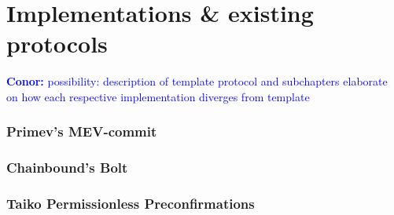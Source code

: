 \documentclass[a4paper]{article}
\theoremstyle{boldstyle}
\newcommand{\cm}[1]{\textcolor{blue}{\textbf{Conor:} #1}}
\begin{document}
        


\section{Implementations \& existing protocols}
    \cm{possibility: description of template protocol and subchapters elaborate on how each respective implementation diverges from template}
        \subsubsection{ \textbf{Primev's MEV-commit}}
        

        \subsubsection{ \textbf{Chainbound's Bolt}}
        
        \subsubsection{ \textbf{Taiko Permissionless Preconfirmations}}
\end{document}
